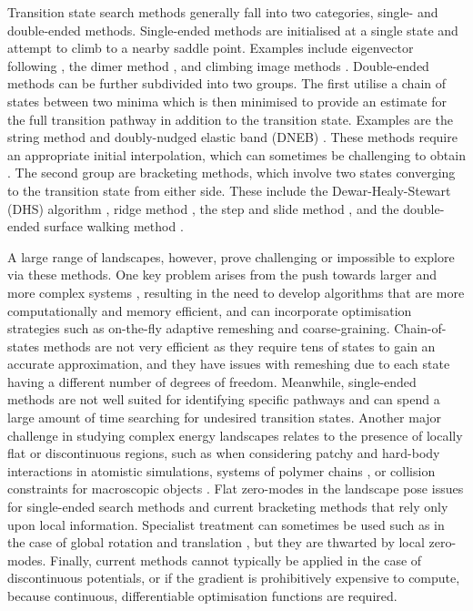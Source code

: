 \documentclass[twocolumn,10pt]{revtex4}
\begin{document}
Transition state search methods generally fall into two categories, single- and double-ended methods.
Single-ended methods are initialised at a single state and attempt to climb to a nearby saddle point.
Examples include eigenvector following \cite{Cerjan1981}, the dimer method \cite{Heyden2005,Kastner2008,Zhang2016}, and climbing image methods \cite{E2007,Ren2013}.
Double-ended methods can be further subdivided into two groups.
The first utilise a chain of states between two minima which is then minimised to provide an estimate for the full transition pathway in addition to the transition state.
Examples are the string method \cite{E2002,E2007} and doubly-nudged elastic band (DNEB) \cite{Trygubenko2004}.
These methods require an appropriate initial interpolation, which can sometimes be challenging to obtain \cite{Wales2012a}.
The second group are bracketing methods, which involve two states converging to the transition state from either side.
These include the Dewar-Healy-Stewart (DHS) algorithm \cite{Dewar1984}, ridge method \cite{Ionova1993}, the step and slide method \cite{Miron2001}, and the double-ended surface walking method \cite{Zhang2013}.

A large range of landscapes, however, prove challenging or impossible to explore via these methods.
One key problem arises from the push towards larger and more complex systems \cite{Trefethen2013,Shalf2020,Alexander2020}, resulting in the need to develop algorithms that are more computationally and memory efficient, and can incorporate optimisation strategies such as on-the-fly adaptive remeshing and coarse-graining.
Chain-of-states methods are not very efficient as they require tens of states to gain an accurate approximation, and they have issues with remeshing due to each state having a different number of degrees of freedom.
Meanwhile, single-ended methods are not well suited for identifying specific pathways and can spend a large amount of time searching for undesired transition states.
Another major challenge in studying complex energy landscapes relates to the presence of locally flat or discontinuous regions, such as when considering patchy \cite{McMullen2018,Nguemaha2018,Chen2018b} and hard-body \cite{Richard2018,Santra2018} interactions in atomistic simulations, systems of polymer chains \cite{Mokkonen2016}, or collision constraints for macroscopic objects \cite{Wriggers2006}.
Flat zero-modes in the landscape pose issues for single-ended search methods and current bracketing methods that rely only upon local information.
Specialist treatment can sometimes be used such as in the case of global rotation and translation \cite{Page1988}, but they are thwarted by local zero-modes.
Finally, current methods cannot typically be applied in the case of discontinuous potentials, or if the gradient is prohibitively expensive to compute, because continuous, differentiable optimisation functions are required.
\end{document}
